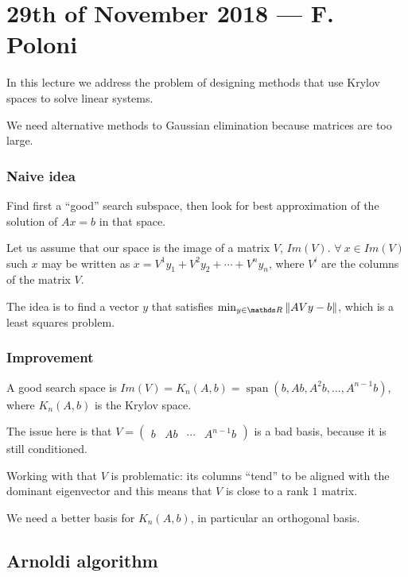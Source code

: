 \documentclass[ComputationalMathematics.tex]{subfiles}
\begin{document}
\section{29th of November 2018 --- F. Poloni}

In this lecture we address the problem of designing methods that use Krylov spaces to solve linear systems.

We need alternative methods to Gaussian elimination because matrices are too large.

\subsubsection{Naive idea}
Find first a ``good'' search subspace, then look for best approximation of the solution of $Ax=b$ in that space.

Let us assume that our space is the image of a matrix $V$, $Im(V)$. $\forall~x \in Im(V)$ such $x$ may be written as $x=V^1 y_1 + V^2 y_2 + \cdots + V^n y_n$, where $V^i$ are the columns of the matrix $V$.

  The idea is to find a vector $y$ that satisfies $\min_{y \in \R} \norm{AVy - b}$, which is a least squares problem.

\subsubsection{Improvement}
A good search space is $Im(V) = K_n(A, b) = \operatorname{span}(b, Ab, A^2b, \ldots, A^{n-1}b)$, where $K_n(A, b)$ is the Krylov space.

  The issue here is that $V=\begin{pmatrix} b & Ab & \cdots & A^{n-1}b\end{pmatrix}$ is a bad basis, because it is still conditioned.

  Working with that $V$ is problematic: its columns ``tend'' to be aligned with the dominant eigenvector and this means that $V$ is close to a rank $1$ matrix.
  
We need a better basis for $K_n(A,b)$, in particular an orthogonal basis.


\subsection{Arnoldi algorithm}
\end{document}
